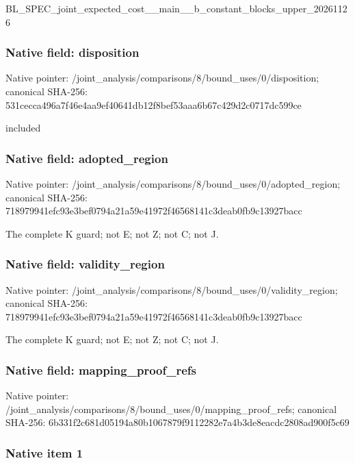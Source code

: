 \documentclass[10pt,a4paper]{article}
\begin{document}
BL\_SPEC\_joint\_expected\_c\allowbreak{}ost\_\_main\_\_b\_constant\_bl\allowbreak{}ocks\_upper\_20261126


\subsubsection{Native field: disposition}


Native pointer: /joint\_analysis/comparis\allowbreak{}ons/8/bound\_uses/0/dispo\allowbreak{}sition; canonical SHA-256: 531cecca496a7f46e4aa9ef4\allowbreak{}0641db12f8bef53aaa6b67c4\allowbreak{}29d2c0717dc599ce


included


\subsubsection{Native field: adopted\_region}


Native pointer: /joint\_analysis/comparis\allowbreak{}ons/8/bound\_uses/0/adopt\allowbreak{}ed\_region; canonical SHA-256: 718979941efc93e3bef0794a\allowbreak{}21a59e41972f46568141c3de\allowbreak{}ab0fb9c13927bacc


The complete K guard; not E; not Z; not C; not J.


\subsubsection{Native field: validity\_region}


Native pointer: /joint\_analysis/comparis\allowbreak{}ons/8/bound\_uses/0/valid\allowbreak{}ity\_region; canonical SHA-256: 718979941efc93e3bef0794a\allowbreak{}21a59e41972f46568141c3de\allowbreak{}ab0fb9c13927bacc


The complete K guard; not E; not Z; not C; not J.


\subsubsection{Native field: mapping\_proof\_refs}


Native pointer: /joint\_analysis/comparis\allowbreak{}ons/8/bound\_uses/0/mappi\allowbreak{}ng\_proof\_refs; canonical SHA-256: 6b331f2c681d05194a80b106\allowbreak{}7879f9112282e7a4b3de8eac\allowbreak{}dc2808ad900f5c69



\subsubsection{Native item 1}
\end{document}
